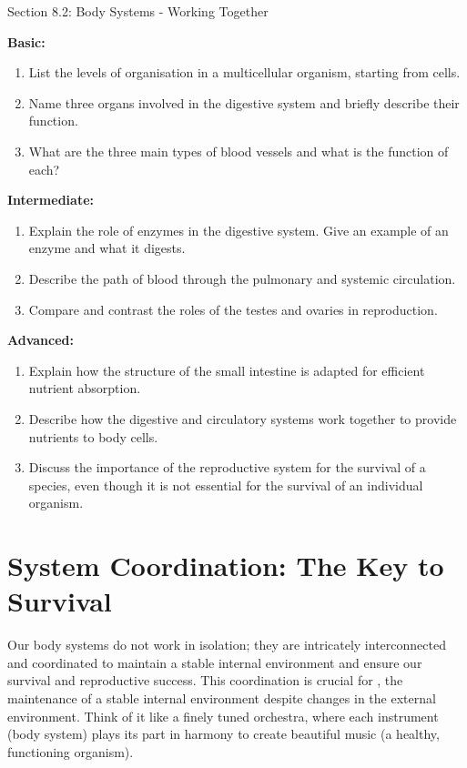 \begin{tieredquestions}{Section 8.2: Body Systems - Working Together}

\textbf{Basic:}
\begin{enumerate}
    \item List the levels of organisation in a multicellular organism, starting from cells.
    \item Name three organs involved in the digestive system and briefly describe their function.
    \item What are the three main types of blood vessels and what is the function of each?
\end{enumerate}

\textbf{Intermediate:}
\begin{enumerate}
    \item Explain the role of enzymes in the digestive system. Give an example of an enzyme and what it digests.
    \item Describe the path of blood through the pulmonary and systemic circulation.
    \item Compare and contrast the roles of the testes and ovaries in reproduction.
\end{enumerate}

\textbf{Advanced:}
\begin{enumerate}
    \item  Explain how the structure of the small intestine is adapted for efficient nutrient absorption.
    \item  Describe how the digestive and circulatory systems work together to provide nutrients to body cells.
    \item  Discuss the importance of the reproductive system for the survival of a species, even though it is not essential for the survival of an individual organism.
\end{enumerate}
\end{tieredquestions}


\section{System Coordination: The Key to Survival}

Our body systems do not work in isolation; they are intricately interconnected and coordinated to maintain a stable internal environment and ensure our survival and reproductive success. This coordination is crucial for , the maintenance of a stable internal environment despite changes in the external environment.  Think of it like a finely tuned orchestra, where each instrument (body system) plays its part in harmony to create beautiful music (a healthy, functioning organism).

